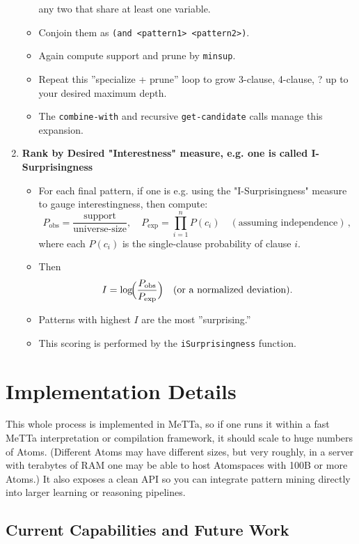 \documentclass{article}
\begin{document}
\begin{enumerate}
\begin{itemize}
    any two that share at least one variable.  
    \item Conjoin them as
    \verb|(and <pattern1> <pattern2>)|. 
    \item  Again compute support and prune by
    \verb|minsup|. 
    \item  Repeat this ''specialize + prune'' loop to grow 3-clause,
    4-clause, ? up to your desired maximum depth.  
    \item The \texttt{combine-with}
    and recursive \texttt{get-candidate} calls manage this expansion.
      \end{itemize}
  \item \textbf{Rank by Desired "Interestness" measure, e.g. one is called I-Surprisingness}
    \begin{itemize}
    \item For each final pattern, if one is e.g. using the "I-Surprisingness" measure to gauge interestingness, then compute:
    \[
      P_{\mathrm{obs}} = \frac{\text{support}}{\text{universe-size}}
      ,\quad
      P_{\mathrm{exp}} = \prod_{i=1}^{n}P(c_i)
      \quad(\text{assuming independence})\,,
    \]
    where each $P(c_i)$ is the single-clause probability of clause $i$.
    \item Then
    $$
      I = \log\!\Bigl(\frac{P_{\mathrm{obs}}}{P_{\mathrm{exp}}}\Bigr)
      \quad\text{(or a normalized deviation)}.
    $$
    \item Patterns with highest $I$ are the most ''surprising.''  
    \item This scoring is performed by the \texttt{iSurprisingness} function.
  \end{itemize}
\end{enumerate}


\section{Implementation Details}

This whole process is implemented in MeTTa, so if one runs it within a fast MeTTa interpretation or compilation framework, it should scale to huge numbers  of Atoms.  (Different Atoms may have different sizes, but very roughly, in a server with terabytes of RAM one may be able to host Atomspaces with 100B or more Atoms.)   It also exposes a clean API so you can integrate pattern mining directly into larger learning or reasoning pipelines.

\subsection{Current Capabilities and Future Work}
\end{document}
